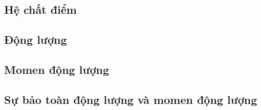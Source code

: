 \subsection{Hệ chất điểm}
\subsection{Động lượng}
\subsection{Momen động lượng}
\subsection{Sự bảo toàn động lượng và momen động lượng}